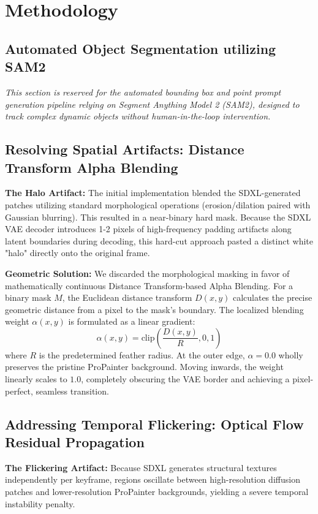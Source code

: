 \documentclass[10pt,twocolumn,letterpaper]{article}
\begin{document}
\section{Methodology}

\subsection{Automated Object Segmentation utilizing SAM2}
\textit{This section is reserved for the automated bounding box and point prompt generation pipeline relying on Segment Anything Model 2 (SAM2), designed to track complex dynamic objects without human-in-the-loop intervention.}

\subsection{Resolving Spatial Artifacts: Distance Transform Alpha Blending}
\textbf{The Halo Artifact:} The initial implementation blended the SDXL-generated patches utilizing standard morphological operations (erosion/dilation paired with Gaussian blurring). This resulted in a near-binary hard mask. Because the SDXL VAE decoder introduces 1-2 pixels of high-frequency padding artifacts along latent boundaries during decoding, this hard-cut approach pasted a distinct white "halo" directly onto the original frame.

\textbf{Geometric Solution:} We discarded the morphological masking in favor of mathematically continuous Distance Transform-based Alpha Blending. For a binary mask $M$, the Euclidean distance transform $D(x, y)$ calculates the precise geometric distance from a pixel to the mask's boundary. The localized blending weight $\alpha(x, y)$ is formulated as a linear gradient:
\begin{equation}
    \alpha(x, y) = \text{clip}\left(\frac{D(x, y)}{R}, 0, 1\right)
\end{equation}
where $R$ is the predetermined feather radius. At the outer edge, $\alpha=0.0$ wholly preserves the pristine ProPainter background. Moving inwards, the weight linearly scales to $1.0$, completely obscuring the VAE border and achieving a pixel-perfect, seamless transition.

\subsection{Addressing Temporal Flickering: Optical Flow Residual Propagation}
\textbf{The Flickering Artifact:} Because SDXL generates structural textures independently per keyframe, regions oscillate between high-resolution diffusion patches and lower-resolution ProPainter backgrounds, yielding a severe temporal instability penalty.
\end{document}
